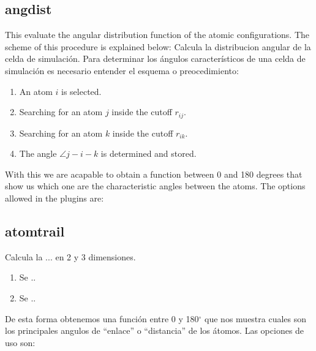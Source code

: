 \subsection{angdist}
This evaluate the angular distribution function of the atomic configurations.
The scheme of this procedure is explained below: 
Calcula la distribucion angular de la celda de simulaci\'on. Para determinar los
\'angulos caracter\'isticos de una celda de simulaci\'on es necesario entender
el esquema o preocedimiento:
\begin{enumerate}
 \item An atom $i$ is selected.
 \item Searching for an atom $j$ inside the cutoff $r_{ij}$.
 \item Searching for an atom $k$ inside the cutoff $r_{ik}$.
 \item The angle  $\angle j-i-k$ is determined and stored.
\end{enumerate}

With this we are acapable to obtain a function between 0 and 180 degrees that
show us which one are the characteristic angles between the atoms. The options
allowed in the plugins are:


\subsection{atomtrail}
Calcula la ... en 2 y 3 dimensiones.
\begin{enumerate}
 \item Se ..
 \item Se ..
\end{enumerate}

De esta forma obtenemos una funci\'on entre 0 y 180$^\circ$ que nos muestra
cuales son los principales angulos de ``enlace'' o ``distancia'' de los
\'atomos. Las opciones de uso son:

